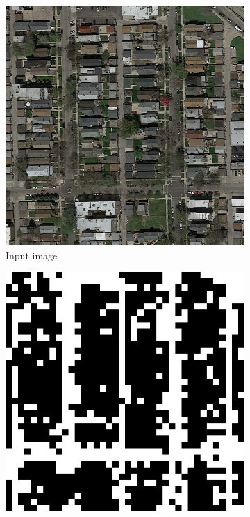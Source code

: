 \documentclass[10pt,conference,compsocconf]{IEEEtran}
\begin{document}
\begin{figure}	
	\centering
	\begin{subfigure}[t]{.19\textwidth}
		\includegraphics[width=1\textwidth]{figs/results_comparison/input_8}
		\caption{Input image}
	\end{subfigure}
	\begin{subfigure}[t]{.19\textwidth}
		\includegraphics[width=1\textwidth]{figs/results_comparison/cnn_baseline_8}

\end{subfigure}
\end{figure}
\end{document}
